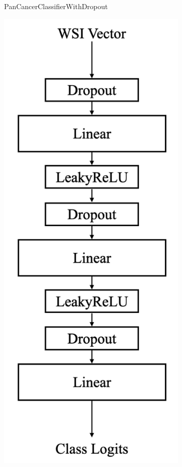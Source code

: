 \documentclass{l4proj}
\begin{document}
\begin{figure}[]
\begin{subfigure}[b]{0.3\textwidth}
        \caption{PanCancerClassifierWithDropout}
        \label{fig:pancancerclassifierdropout}
    \end{subfigure}
    \quad
    \begin{subfigure}[b]{0.3\textwidth}
        \includegraphics[width=\textwidth]{images/dropoutleakyclassifier.png}

\end{subfigure}
\end{figure}
\end{document}
